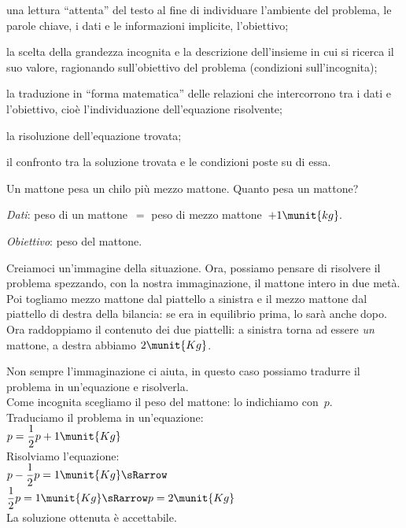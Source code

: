 \begin{enumeratea}
\item una lettura ``attenta'' del
testo al fine di individuare l'ambiente del problema,
le parole chiave, i dati e le informazioni implicite,
l'obiettivo;
\item la scelta della grandezza incognita e la descrizione
dell'insieme in cui si ricerca il suo valore,
ragionando sull'obiettivo del problema (condizioni sull'incognita);
\item la traduzione in ``forma matematica'' delle relazioni che intercorrono 
tra i dati e l'obiettivo, cioè l'individuazione dell'equazione risolvente;
\item la risoluzione dell'equazione trovata;
\item il confronto tra la soluzione trovata e le condizioni poste su di essa.
\end{enumeratea}

\begin{problema}{}{}
 Un mattone pesa un chilo più mezzo mattone. Quanto pesa un mattone?
\end{problema}

\emph{Dati}: peso di un mattone~\(=\) peso di mezzo 
mattone~\(+ 1\munit{kg}.\)

\emph{Obiettivo}: peso del mattone.

\begin{minipage}{.48\textwidth}
\bilanciaa
\end{minipage}
\hfill
\begin{minipage}{.48\textwidth}
Creiamoci un'immagine della situazione.
Ora, possiamo pensare di risolvere il problema spezzando, con la nostra 
immaginazione, il mattone intero in due metà.
Poi togliamo mezzo mattone dal piattello a sinistra e il mezzo mattone dal 
piattello di destra della bilancia:
se era in equilibrio prima, lo sarà anche dopo.\\
Ora raddoppiamo il contenuto dei due piattelli: a sinistra torna ad essere 
\emph{un} mattone, a destra abbiamo \(2\munit{Kg}\).
\end{minipage}

\begin{minipage}{.48\textwidth}
Non sempre l'immaginazione ci aiuta, in questo caso possiamo tradurre il 
problema in un'equazione e risolverla.\\
Come incognita scegliamo il peso del mattone: lo indichiamo con~\(p\).\\
Traduciamo il problema in un'equazione:\\
\(p=\dfrac{1}{2}p+1\munit{Kg}\)\\
Risolviamo l'equazione:\\
\(p-\dfrac{1}{2}p=1\munit{Kg} \sRarrow \)\\
\(\dfrac{1}{2}p=1\munit{Kg} \sRarrow p=2\munit{Kg}\)\\
La soluzione ottenuta è accettabile.
\end{minipage}
\hfill
\begin{minipage}{.48\textwidth}
\bilanciaa
\end{minipage}

